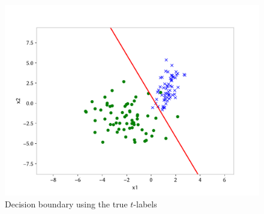 \begin{answer}
    \begin{figure}[h]
        \centering
        \includegraphics*[width=.7\linewidth]{../src/posonly/part_a.pdf}
        \caption{Decision boundary using the true $t$-labels}        
    \end{figure}
\end{answer}
